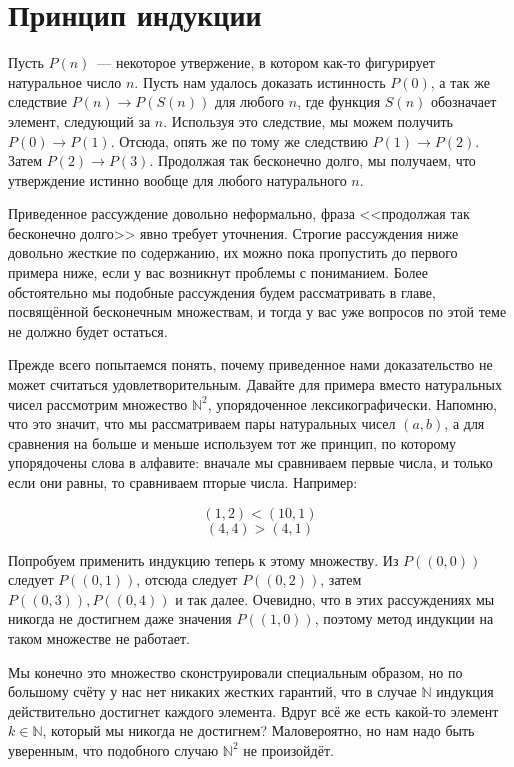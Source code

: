 \section{Принцип индукции}

Пусть $P(n)$~--- некоторое утвержение, в котором как-то фигурирует натуральное число $n$. Пусть нам удалось доказать истинность $P(0)$, а так же следствие $P(n)\to P(S(n))$ для любого $n$, где функция $S(n)$ обозначает элемент, следующий за $n$. Используя это следствие, мы можем получить $P(0)\to P(1)$. Отсюда, опять же по тому же следствию $P(1)\to P(2)$. Затем $P(2)\to P(3)$. Продолжая так бесконечно долго, мы получаем, что утверждение истинно вообще для любого натурального $n$.

Приведенное рассуждение довольно неформально, фраза <<продолжая так бесконечно долго>> явно требует уточнения. Строгие рассуждения ниже довольно жесткие по содержанию, их можно пока пропустить до первого примера ниже, если у вас возникнут проблемы с пониманием. Более обстоятельно мы подобные рассуждения будем рассматривать в главе, посвящённой бесконечным множествам, и тогда у вас уже вопросов по этой теме не должно будет остаться.

Прежде всего попытаемся понять, почему приведенное нами доказательство не может считаться удовлетворительным. Давайте для примера вместо натуральных чисел рассмотрим множество $\mathbb{N}^2$, упорядоченное лексикографически. Напомню, что это значит, что мы рассматриваем пары натуральных чисел $(a, b)$, а для сравнения на больше и меньше используем тот же принцип, по которому упорядочены слова в алфавите: вначале мы сравниваем первые числа, и только если они равны, то сравниваем пторые числа. Например:

$$(1, 2) < (10, 1)$$
$$(4, 4) > (4, 1)$$

Попробуем применить индукцию теперь к этому множеству. Из $P((0, 0))$ следует $P((0, 1))$, отсюда следует $P((0, 2))$, затем $P((0, 3)), P((0, 4))$ и так далее. Очевидно, что в этих рассуждениях мы никогда не достигнем даже значения $P((1, 0))$, поэтому метод индукции на таком множестве не работает.

Мы конечно это множество сконструировали специальным образом, но по большому счёту у нас нет никаких жестких гарантий, что в случае $\mathbb{N}$ индукция действительно достигнет каждого элемента. Вдруг всё же есть какой-то элемент $k\in \mathbb{N}$, который мы никогда не достигнем? Маловероятно, но нам надо быть уверенным, что подобного случаю $\mathbb{N}^2$ не произойдёт.

